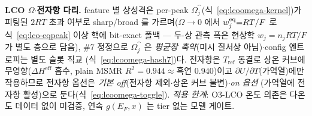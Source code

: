 \begin{keybox}
\textbf{LCO $\Omega$$\cdot$전자항 다리.} feature 별 상성격은 per-peak $\Omega_j^\cat$(식~\eqref{eq:lcoomega-kernel})가
피팅된 $2RT$ 초과 여부로 sharp/broad 를 가르며($\Omega\!\to\!0$ 에서 $w_j^{\mathrm{eq}}{=}RT/F$ 로 식~\eqref{eq:lco-eqpeak}
이상 핵에 bit-exact 폴백 --- 두-상 관측 폭은 현상학 $w_j{=}n_jRT/F$ 가 별도 층으로 담음), \#7 정정으로
$\Omega_j^\cat$ 은 \emph{평균장 축약}(미시 질서상 아님)$\cdot$config 엔트로피는 별도 슬롯 직교
(식~\eqref{eq:lcoomega-hash7})다. 전자항은 $T_\mathrm{ref}$ 동결로 상온 커브에 무영향($\Delta H^\mathrm{eff}$
흡수, plain MSMR $R^2{=}0.944\!\approx\!$흑연 $0.940$)이고 $\partial U/\partial T$(가역열)에만 작용하므로
전자항 옵션은 \emph{기본 off}(전자항 제외$\cdot$상온 커브 불변)$\cdot$\emph{on 옵션}
(가역열에 전자항 활성)으로 둔다(식~\eqref{eq:lcoomega-toggle}).
\emph{적용 한계}: O3-LCO 온도 의존은 다온도 데이터 없이 미검증, 연속 $g(E_F,x)$ 는 tier 없는 모델 게이트.
\end{keybox}

